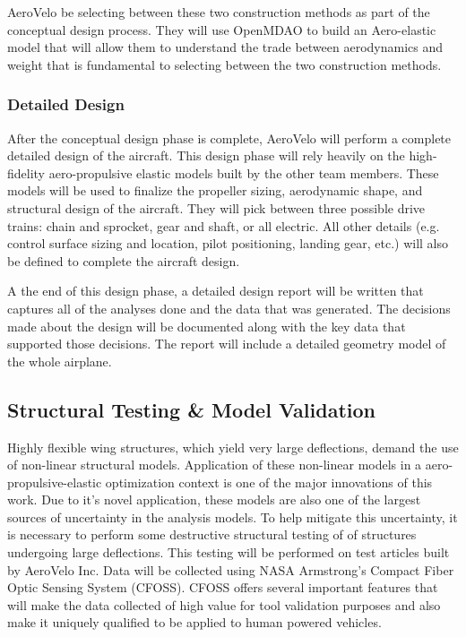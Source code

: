 \documentclass[]{aiaa-tc}
\begin{document}
        AeroVelo be selecting between these two construction methods as part of the conceptual design process. They will use 
        OpenMDAO to build an Aero-elastic model that will allow them to understand the trade between aerodynamics and weight 
        that is fundamental to selecting between the two construction methods. 

        \subsubsection{Detailed Design}

        After the conceptual design phase is complete, AeroVelo will perform a complete detailed design of the aircraft. This 
        design phase will rely heavily on the high-fidelity aero-propulsive elastic models built by the other team members. 
        These models will be used to finalize the propeller sizing, aerodynamic shape, and structural design of the aircraft. They will pick 
        between three possible drive trains: chain and sprocket, gear and shaft, or all electric. All other details (e.g. control
        surface sizing and location, pilot positioning, landing gear, etc.) will also be defined to complete the aircraft 
        design. 

        A the end of this design phase, a detailed design report will be written that captures all of the analyses done 
        and the data that was generated. The decisions made about the design will be documented along with the key data that 
        supported those decisions. The report will include a detailed geometry model of the whole airplane. 



    \subsection{Structural Testing \& Model Validation}
        
        Highly flexible wing structures, which yield very large deflections, demand the use of non-linear structural models. 
        Application of these non-linear models in a aero-propulsive-elastic optimization context is one of the major innovations of this 
        work. Due to it's novel application, these models are also one of the largest sources of uncertainty in the analysis models. 
        To help mitigate this uncertainty, it is necessary to perform some destructive structural testing of of structures undergoing large 
        deflections. This testing will be performed on test articles built by AeroVelo Inc. Data will be collected using 
        NASA Armstrong's Compact Fiber Optic Sensing System (CFOSS). CFOSS offers several important features that will make the 
        data collected of high value for tool validation purposes and also make it uniquely qualified to be applied to human powered vehicles. 
\end{document}
